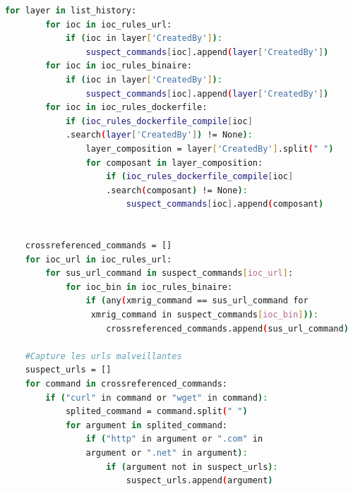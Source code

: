 \begin{lstlisting}[language=bash]
    for layer in list_history:
        for ioc in ioc_rules_url:
            if (ioc in layer['CreatedBy']):
                suspect_commands[ioc].append(layer['CreatedBy']) 
        for ioc in ioc_rules_binaire:
            if (ioc in layer['CreatedBy']):
                suspect_commands[ioc].append(layer['CreatedBy']) 
        for ioc in ioc_rules_dockerfile:
            if (ioc_rules_dockerfile_compile[ioc]
            .search(layer['CreatedBy']) != None):
                layer_composition = layer['CreatedBy'].split(" ")
                for composant in layer_composition:
                    if (ioc_rules_dockerfile_compile[ioc]
                    .search(composant) != None):
                        suspect_commands[ioc].append(composant)


    crossreferenced_commands = []
    for ioc_url in ioc_rules_url:
        for sus_url_command in suspect_commands[ioc_url]:
            for ioc_bin in ioc_rules_binaire:
                if (any(xmrig_command == sus_url_command for
                 xmrig_command in suspect_commands[ioc_bin])):
                    crossreferenced_commands.append(sus_url_command)
    
    #Capture les urls malveillantes
    suspect_urls = []
    for command in crossreferenced_commands:
        if ("curl" in command or "wget" in command):
            splited_command = command.split(" ")
            for argument in splited_command:
                if ("http" in argument or ".com" in 
                argument or ".net" in argument):
                    if (argument not in suspect_urls):
                        suspect_urls.append(argument)
\end{lstlisting}

